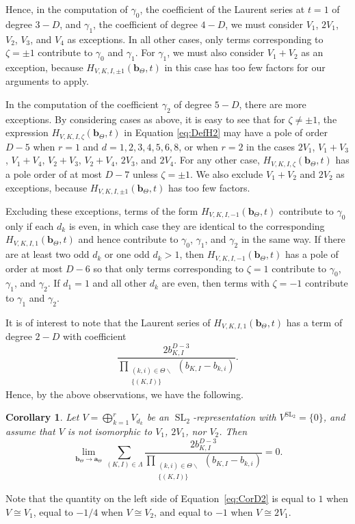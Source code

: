 \documentclass{amsart}
\newtheorem{corollary}[theorem]{Corollary}
\theoremstyle{definition}
\theoremstyle{remark}
\newcommand{\SL}{\operatorname{SL}}
\newcommand{\bs}{\boldsymbol}
\begin{document}
Hence, in the computation of $\gamma_0$, the coefficient of the Laurent series at $t = 1$ of degree $3-D$,
and $\gamma_1$, the coefficient of degree $4-D$, we must consider  $V_1$, $2V_1$, $V_2$, $V_3$, and $V_4$ as exceptions. In all other cases, only terms corresponding to $\zeta = \pm 1$ contribute to $\gamma_0$ and $\gamma_1$.
For $\gamma_1$, we must also consider $V_1 + V_2$ as an exception, because $H_{V,K,I,\pm 1}(\bs{b}_\Theta, t)$
in this case has too few factors for our arguments to apply.

In the computation of the coefficient $\gamma_2$ of degree $5-D$, there are more exceptions.
By considering cases as above, it is easy to see that for $\zeta\neq\pm 1$, the expression
$H_{V,K,I,\zeta}(\bs{b}_\Theta, t)$ in Equation \eqref{eq:DefH2} may have a pole of order
$D-5$ when $r = 1$ and $d = 1, 2, 3, 4, 5, 6, 8$, or when $r = 2$ in the cases
$2V_1$, $V_1+V_3$, $V_1+V_4$, $V_2+V_3$, $V_2+V_4$, $2V_3$, and $2V_4$. For any other case,
$H_{V,K,I,\zeta}(\bs{b}_\Theta, t)$ has a pole order of at most $D-7$ unless $\zeta=\pm 1$.
We also exclude $V_1+V_2$ and $2V_2$ as exceptions, because $H_{V,K,I,\pm 1}(\bs{b}_\Theta, t)$
has too few factors.

Excluding these exceptions, terms of the form $H_{V,K,I,-1}(\bs{b}_\Theta, t)$ contribute to
$\gamma_0$ only if each $d_k$ is even, in which case they are identical to the
corresponding $H_{V,K,I,1}(\bs{b}_\Theta, t)$ and hence contribute to $\gamma_0$, $\gamma_1$, and $\gamma_2$
in the same way.
If there are at least two odd $d_k$ or one odd $d_k > 1$, then
$H_{V,K,I,-1}(\bs{b}_\Theta, t)$ has a pole of order at most $D-6$ so that
only terms corresponding to $\zeta = 1$ contribute to $\gamma_0$, $\gamma_1$, and $\gamma_2$. If $d_1 = 1$ and all other $d_k$ are even,
then terms with $\zeta = -1$ contribute to $\gamma_1$ and $\gamma_2$.

It is of interest to note that the Laurent series of $H_{V,K,I,1}(\bs{b}_\Theta, t)$ has a term of degree $2-D$ with
coefficient
\[
    \frac{2b_{K,I}^{D-3} }
        {\prod\limits_{\substack{(k,i)\in\Theta\smallsetminus \\ \{(K,I)\} }}
            (b_{K,I}-b_{k,i}) }.
\]
Hence, by the above observations, we have the following.

\begin{corollary}
\label{cor:FirstCoeffVanish}
Let $V = \bigoplus_{k=1}^r V_{d_k}$ be an $\SL_2$-representation with $V^{\SL_2} = \{0\}$,
and assume that $V$ is not isomorphic to $V_1$, $2V_1$, nor $V_2$. Then
\begin{equation}
\label{eq:CorD2}
    \lim\limits_{\bs{b}_\Theta\to\bs{a}_\Theta} \sum\limits_{(K,I)\in\Lambda}
    \frac{2b_{K,I}^{D-3} }
        {\prod\limits_{\substack{(k,i)\in\Theta\smallsetminus \\ \{(K,I)\} }}
            (b_{K,I}-b_{k,i}) }
    = 0.
\end{equation}
\end{corollary}
Note that the quantity on the left side of Equation~\eqref{eq:CorD2} is equal to $1$ when
$V\cong V_1$, equal to $-1/4$ when $V\cong V_2$, and equal to $-1$ when $V\cong 2V_1$.
\end{document}
